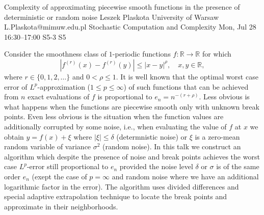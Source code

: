\begin{talk}
  {Complexity of approximating piecewise smooth functions in the presence of deterministic or random noise}%
  {Leszek Plaskota}%
  {University of Warsaw}%
  {L.Plaskota@mimuw.edu.pl}%
  {Stochastic Computation and Complexity}%
  {}%
  {Mon, Jul 28 16:30–17:00}%
  {S5-3}%
  {S5}%
				
			
Consider the smoothness class of $1$-periodic functions $f:\mathbb R\to\mathbb R$ for which 
$$|f^{(r)}(x)-f^{(r)}(y)|\le |x-y|^\rho,\quad x,y\in\mathbb R,$$ 
where $r\in\{0,1,2,\ldots\}$ and $0<\rho\le 1.$ It is well known that the optimal worst case error of $L^p$-approximation ($1\le p\le\infty$) of such functions that can be achieved from $n$ exact evaluations of $f$ is proportional to $e_n=n^{-(r+\rho)}.$ Less obvious is what happens when the functions are piecewise smooth only with unknown break points. Even less obvious is the situation when the function values are additionally corrupted by some noise, i.e., when evaluating the value of $f$ at $x$ we obtain $y=f(x)+\xi$ where $|\xi|\le\delta$ (determnistic noise) or $\xi$ is a zero-mean random variable of variance $\sigma^2$ (random noise). In this talk we construct an algorithm which despite the presence of noise and break points achieves the worst case $L^p$-error still proportional to $e_n$ provided the noise level $\delta$ or $\sigma$ is of the same order $e_n$ (exept the case of $p=\infty$ and random noise where we have an additional logarithmic factor in the error). The algorithm uses divided differences and special adaptive extrapolation technique to locate the break points and approximate in their neighborhoods. 

\end{talk}

